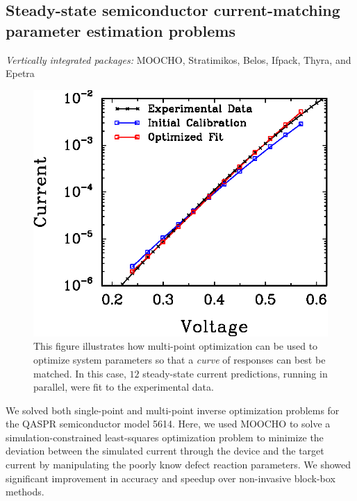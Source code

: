 \documentclass[pdf,ps2pdf,11pt]{SANDreport}
\begin{document}
%
\subsection{Steady-state semiconductor current-matching parameter
estimation problems}
%

{}\noindent\textit{Vertically integrated packages:} MOOCHO, Stratimikos,
Belos, Ifpack, Thyra, and Epetra

{\bsinglespace
\begin{figure}
\begin{center}
\includegraphics*[angle=0,scale=0.80,width=0.50\linewidth
]{multiPointFit}
\end{center}
\caption[Multipoint current-matching parameter estimation solution against experimental data]{
\label{fig:multiPointFit}
This figure illustrates how multi-point optimization can be used to optimize
system parameters so that a {\em curve} of responses can best be matched. In
this case, $12$ steady-state current predictions, running in parallel, were
fit to the experimental data.}
\end{figure}
\esinglespace}

We solved both single-point and multi-point inverse optimization problems for
the QASPR semiconductor model 5614.  Here, we used MOOCHO to solve a
simulation-constrained least-squares optimization problem to minimize the
deviation between the simulated current through the device and the target
current by manipulating the poorly know defect reaction parameters.  We showed
significant improvement in accuracy and speedup over non-invasive block-box
methods.


\end{document}
